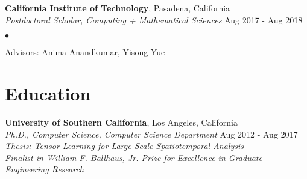 \documentclass[margin,line]{res}
\newenvironment{list1}{
  \begin{list}{\ding{113}}{%
      \setlength{\itemsep}{0in}
      \setlength{\parsep}{0in} \setlength{\parskip}{0in}
      \setlength{\topsep}{0in} \setlength{\partopsep}{0in} 
      \setlength{\leftmargin}{0.17in}}}{\end{list}}
\newenvironment{list2}{
  \begin{list}{$\bullet$}{%
      \setlength{\itemsep}{0in}
      \setlength{\parsep}{0in} \setlength{\parskip}{0in}
      \setlength{\topsep}{0in} \setlength{\partopsep}{0in} 
      \setlength{\leftmargin}{0.2in}}}{\end{list}}
\begin{document}
\begin{resume}
{\bf California Institute of Technology}, Pasadena, California\\
{\em Postdoctoral Scholar,  Computing + Mathematical Sciences} \hfill {Aug 2017 - Aug 2018}

\begin{list2}
\item Advisors:  Anima Anandkumar, Yisong Yue
\end{list2}





\section{\sc Education}
{\bf University of Southern California}, Los Angeles, California\\
{\em Ph.D., Computer Science, Computer Science Department} \hfill {Aug 2012 - Aug 2017}\\
{\em Thesis: Tensor Learning for Large-Scale Spatiotemporal Analysis} \\
{\em Finalist in William F. Ballhaus, Jr. Prize for Excellence in Graduate Engineering Research}




\end{resume}
\end{document}

